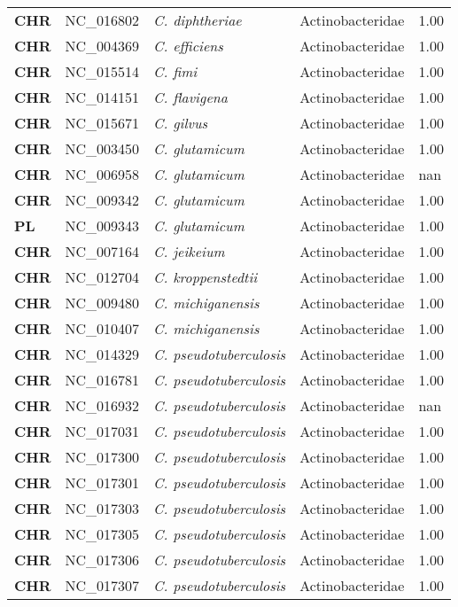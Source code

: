\begin{adjustwidth}{-3cm}{2cm}
{\begin{supertabular}{>{\bfseries}l|p{0.1\textwidth}p{0.14\textwidth}l|l}
CHR & NC\_016802 & \textit{C. diphtheriae} & Actinobacteridae & 1.00\\
CHR & NC\_004369 & \textit{C. efficiens} & Actinobacteridae & 1.00\\
CHR & NC\_015514 & \textit{C. fimi} & Actinobacteridae & 1.00\\
CHR & NC\_014151 & \textit{C. flavigena} & Actinobacteridae & 1.00\\
CHR & NC\_015671 & \textit{C. gilvus} & Actinobacteridae & 1.00\\
CHR & NC\_003450 & \textit{C. glutamicum} & Actinobacteridae & 1.00\\
CHR & NC\_006958 & \textit{C. glutamicum} & Actinobacteridae & nan\\
CHR & NC\_009342 & \textit{C. glutamicum} & Actinobacteridae & 1.00\\
PL & NC\_009343 & \textit{C. glutamicum} & Actinobacteridae & 1.00\\
CHR & NC\_007164 & \textit{C. jeikeium} & Actinobacteridae & 1.00\\
CHR & NC\_012704 & \textit{C. kroppenstedtii} & Actinobacteridae & 1.00\\
CHR & NC\_009480 & \textit{C. michiganensis} & Actinobacteridae & 1.00\\
CHR & NC\_010407 & \textit{C. michiganensis} & Actinobacteridae & 1.00\\
CHR & NC\_014329 & \textit{C. pseudotuberculosis} & Actinobacteridae & 1.00\\
CHR & NC\_016781 & \textit{C. pseudotuberculosis} & Actinobacteridae & 1.00\\
CHR & NC\_016932 & \textit{C. pseudotuberculosis} & Actinobacteridae & nan\\
CHR & NC\_017031 & \textit{C. pseudotuberculosis} & Actinobacteridae & 1.00\\
CHR & NC\_017300 & \textit{C. pseudotuberculosis} & Actinobacteridae & 1.00\\
CHR & NC\_017301 & \textit{C. pseudotuberculosis} & Actinobacteridae & 1.00\\
CHR & NC\_017303 & \textit{C. pseudotuberculosis} & Actinobacteridae & 1.00\\
CHR & NC\_017305 & \textit{C. pseudotuberculosis} & Actinobacteridae & 1.00\\
CHR & NC\_017306 & \textit{C. pseudotuberculosis} & Actinobacteridae & 1.00\\
CHR & NC\_017307 & \textit{C. pseudotuberculosis} & Actinobacteridae & 1.00\\

\end{supertabular}}
\end{adjustwidth}
